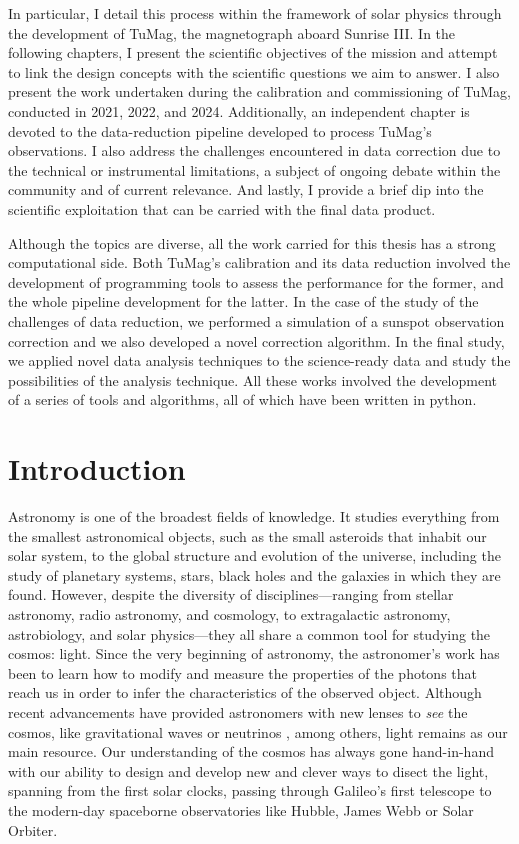 In particular, I detail this process within the framework of solar physics through the development of TuMag, the magnetograph aboard Sunrise III. In the following chapters, I present the scientific objectives of the mission and attempt to link the design concepts with the scientific questions we aim to answer. I also present the work undertaken during the calibration and commissioning of TuMag, conducted in 2021, 2022, and 2024. Additionally, an independent chapter is devoted to the data-reduction pipeline developed to process TuMag's observations. I also address the challenges encountered in data correction due to the technical or instrumental limitations, a subject of ongoing debate within the community and of current relevance. And lastly, I provide a brief dip into the scientific exploitation that can be carried with the final data product. 

Although the topics are diverse, all the work carried for this thesis has a strong computational side. Both TuMag's calibration and its data reduction involved the development of programming tools to assess the performance for the former, and the whole pipeline development for the latter. In the case of the study of the challenges of data reduction, we performed a simulation of a sunspot observation correction and we also developed a novel correction algorithm. In the final study, we applied novel data analysis techniques to the science-ready data and study the possibilities of the analysis technique. All these works involved the development of a series of tools and algorithms, all of which have been written in python.

\section{Introduction}

Astronomy is one of the broadest fields of knowledge. It studies everything from the smallest astronomical objects, such as the small asteroids that inhabit our solar system, to the global structure and evolution of the universe, including the study of planetary systems, stars, black holes and the galaxies in which they are found. However, despite the diversity of disciplines—ranging from stellar astronomy, radio astronomy, and cosmology, to extragalactic astronomy, astrobiology, and solar physics—they all share a common tool for studying the cosmos: light. Since the very beginning of astronomy, the astronomer's work has been to learn how to modify and measure the properties of the photons that reach us in order to infer the characteristics of the observed object. Although recent advancements have provided astronomers with new lenses to \textit{see} the cosmos, like gravitational waves \citep{gravitational_waves} or neutrinos \citep{neutrinos}, among others, light remains as our main resource. Our understanding of the cosmos has always gone hand-in-hand with our ability to design and develop new and clever ways to disect the light, spanning from the first solar clocks, passing through Galileo's first telescope to the modern-day spaceborne observatories like Hubble, James Webb or Solar Orbiter. 

